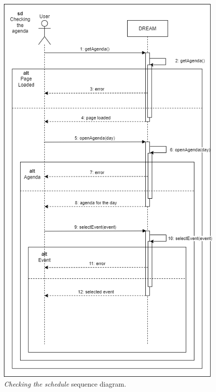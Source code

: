 \begin{figure}[H]
    \centering
    \includegraphics[height=1.5\linewidth]{Images/Use Case/UC15.png}
    \caption{\textit{Checking the schedule} sequence diagram.}
\end{figure}
\newpage


